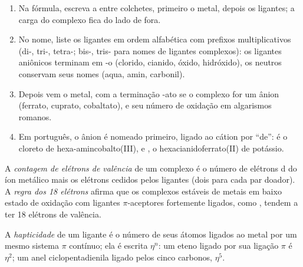 \begin{method}\label{met:b2:coordination-complexes:naming}
\begin{enumerate}
  \item Na fórmula, escreva a  entre colchetes, primeiro o
        metal, depois os ligantes; a carga do complexo fica do lado de fora.
  \item No nome, liste os ligantes em ordem alfabética com prefixos
        multiplicativos (di-, tri-, tetra-; bis-, tris- para nomes de ligantes
        complexos): os ligantes aniônicos terminam em -o (clorido, cianido,
        óxido, hidróxido), os neutros conservam seus nomes (aqua, amin,
        carbonil).
  \item Depois vem o metal, com a terminação -ato se o complexo for um ânion
        (ferrato, cuprato, cobaltato), e seu número de oxidação em algarismos
        romanos.
  \item Em português, o ânion é nomeado primeiro, ligado ao cátion por
        ``de'':  é o cloreto de hexa-amincobalto(III), e
        , o hexacianidoferrato(II) de potássio.
\end{enumerate}
\end{method}

\begin{definition}\label{def:b2:coordination-complexes:electron-count}
A \emph{contagem de elétrons de valência} de um complexo é
o número de elétrons d do íon metálico mais os elétrons cedidos pelos ligantes
(dois para cada par doador). A \emph{regra dos 18 elétrons} afirma
que os complexos estáveis de metais em baixo estado de oxidação com ligantes
$\pi$-aceptores fortemente ligados, como , tendem a ter 18 elétrons de
valência.
\end{definition}

\begin{definition}[Hapticidade]\label{def:b2:coordination-complexes:hapticity}
A \emph{hapticidade} de um ligante é o número de seus átomos
ligados ao metal por um mesmo sistema $\pi$ contínuo; ela é escrita $\eta^n$: um
eteno ligado por sua ligação $\pi$ é $\eta^2$; um anel ciclopentadienila ligado
pelos cinco carbonos, $\eta^5$.
\end{definition}

